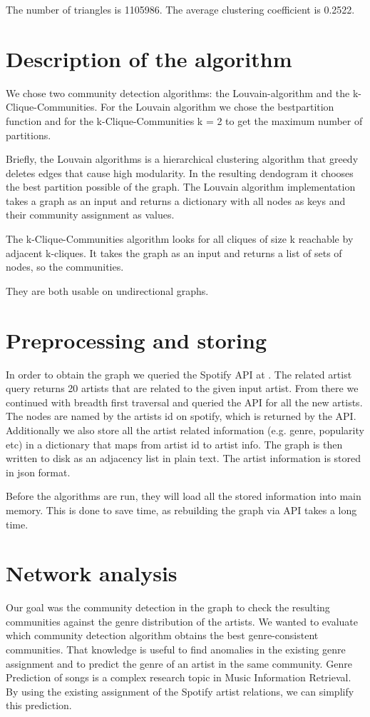 \documentclass[11pt,a4paper,onecolumn,notitlepage]{article}
\begin{document}
The number of triangles is 1105986. The average clustering coefficient is 0.2522.

\section{Description of the algorithm}

We chose two community detection algorithms: the Louvain-algorithm\cite{louvain} and the k-Clique-Communities\cite{kclique}. For the Louvain algorithm we chose the bestpartition function and for the k-Clique-Communities k = 2 to get the maximum number of partitions.

Briefly, the Louvain algorithms is a hierarchical clustering algorithm that greedy deletes edges that cause high modularity. In the resulting dendogram it chooses the best partition possible of the graph. The Louvain algorithm implementation takes a graph as an input and returns a dictionary with all nodes as keys and their community assignment as values. 

The k-Clique-Communities algorithm looks for all cliques of size k reachable by adjacent k-cliques. It takes the graph as an input and returns a list of sets of nodes, so the communities.

They are both usable on undirectional graphs.

\section{Preprocessing and storing}

In order to obtain the graph we queried the Spotify API at \cite{spotifyapi}. The related artist query returns 20 artists that are related to the given input artist.
From there we continued with breadth first traversal and queried the API for all the new artists.
The nodes are named by the artists id on spotify, which is returned by the API.
Additionally we also store all the artist related information (e.g. genre, popularity etc) in a dictionary that maps from artist id to artist info.
The graph is then written to disk as an adjacency list in plain text. The artist information is stored in json format.

Before the algorithms are run, they will load all the stored information into main memory. This is done to save time, as rebuilding the graph via API takes a long time.

\section{Network analysis}
Our goal was the community detection in the graph to check the resulting communities against the genre distribution of the artists. We wanted to evaluate which community detection algorithm obtains the best genre-consistent communities. That knowledge is useful to find anomalies in the existing genre assignment and to predict the genre of an artist in the same community. Genre Prediction of songs is a complex research topic in Music Information Retrieval. By using the existing assignment of the Spotify artist relations, we can simplify this prediction.
\end{document}
